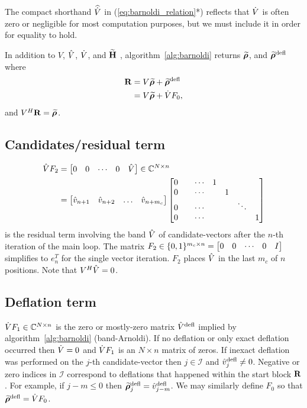 The compact shorthand $\widehat{\dot{V}}$ in (\ref{eq:barnoldi_relation}*)  reflects that $\dot{V}$ is
often zero or negligible for most computation purposes, but we must include it in order for equality to hold.     

In addition to $V$, $\hat{V}$, $\dot{V}$, and $\widetilde{\textbf{\textup{H}}}$   , algorithm~\ref{alg:barnoldi} returns $\widetilde{\boldsymbol{\rho}}$, and $\widetilde{\boldsymbol{\rho}}^{\text{defl}}$ where
\begin{equation}
\begin{aligned}
\textbf{\textup{R}} &= V \widetilde{\boldsymbol{\rho}} + \widetilde{\boldsymbol{\rho}}^{\text{defl}}\\
& = V \widetilde{\boldsymbol{\rho}} + \dot{V} F_0,
\end{aligned}
\label{eq:barnoldi_rho_relation}
\end{equation}
and $V^H\textbf{\textup{R}} = \widetilde{\boldsymbol{\rho}}$.  

\subsection{Candidates/residual term}
{\singlespacing
\begin{align*}
\hat{V} F_2 &= \begin{bmatrix} 0&0&\cdots&0&\hat{V}\end{bmatrix}\in\mathbb{C}^{N \times n}\\
&= \begin{bmatrix} \hat{v}_{n+1}&\hat{v}_{n+2} &\ldots&\hat{v}_{n+ m_c}\end{bmatrix}
\begin{bmatrix} 0&&\cdots&1\\
 0&&\cdots&&1 \\
  0  &&\cdots&&&\ddots \\ 
   0 &&\cdots&&&&1 \end{bmatrix}
\end{align*}
}
 is the residual term involving the band $\hat{V}$ of candidate-vectors after the $n$-th iteration of the main loop.
The matrix $F_2\in\{0,1 \}^{m_c\times n}=\begin{bmatrix} 0&0&\cdots&0&I\end{bmatrix}$ simplifies to $e^T_n$ for the single vector iteration.  $F_2$ places $\hat{V}$ in the last $m_c$ of $n$ positions.   Note that $V^H\hat{V}=0$.



\subsection{Deflation term}
$\dot{V} F_1\in\mathbb{C}^{N\times n}$ is the zero or mostly-zero matrix $\hat{V}^{\text{defl}}$ implied by algorithm~\ref{alg:barnoldi} (band-Arnoldi).  If no deflation or only exact deflation occurred then $\dot{V}=0$ and $\dot{V} F_1$ is an $N\times n$ matrix of zeros.   If inexact deflation was performed on the $j$-th candidate-vector then $j\in\mathcal{I}$ and $\hat{v}^{\text{defl}}_j\neq 0$.   Negative or zero indices  in $\mathcal{I}$ correspond to deflations that happened within the start block $\textbf{\textup{R}}$.  For example, if $j-m\leq 0$ then $\widetilde{\boldsymbol{\rho}}^{\text{defl}}_j=\hat{v}^{\text{defl}}_{j-m}$.   We may similarly define $F_0$ so that $\widetilde{\boldsymbol{\rho}}^{\text{defl}}=\dot{V} F_0$.

